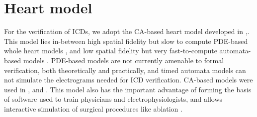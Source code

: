 \section{Heart model}
\label{sec:heartcellularautomata}
For the verification of \acp{ICD},
we adopt the \acf{CA}-based heart model developed in \cite{Spector11_Emergence},\cite{StinnettDonnelly12_EGMresolution}.
This model lies in-between high spatial fidelity but slow to compute PDE-based whole heart models  \cite{vfiborganization_Tusscher07}, and low spatial fidelity but very fast-to-compute automata-based models \cite{TECS}.
PDE-based models are not currently amenable to formal verification, both theoretically and practically, and timed automata models can not simulate the electrograms needed for \ac{ICD} verification.
\ac{CA}-based models were used in \cite{Mery},\cite{BartocciCBESG09_HIOAmodeling} and \cite{Chen14_Quantitative}.
This model also has the important advantage of forming the basis of software used to train physicians and electrophysiologists, and allows interactive simulation of surgical procedures like ablation \cite{visibleep}.

